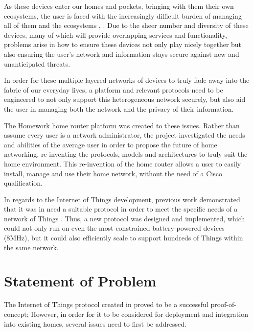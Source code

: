 \documentclass{mprop}
\begin{document}
As these devices enter our homes and pockets, bringing with them their own ecosystems, the user is faced with the increasingly difficult burden of managing all of them and the ecosystems \cite{brundell2011w}, \cite{brown2013multinet}. Due to the sheer number and diversity of these devices, many of which will provide overlapping services and functionality, problems arise in how to ensure these devices not only play nicely together but also ensuring the user's network and information stays secure against new and unanticipated threats.

In order for these multiple layered networks of devices to truly fade away into the fabric of our everyday lives, a platform and relevant protocols need to be engineered to not only support this heterogeneous network securely, but also aid the user in managing both the network and the privacy of their information.

The Homework home router platform was created to these issues. Rather than assume every user is a network administrator, the project investigated the needs and abilities of the average user in order to propose the future of home networking, re-inventing the protocols, models and architectures to truly suit the home environment. This re-invention of the home router allows a user to easily install, manage and use their home network, without the need of a Cisco qualification.

In regards to the Internet of Things development, previous work demonstrated that it was in need a suitable protocol in order to meet the specific needs of a network of Things \cite{KNoT}. Thus, a new protocol was designed and implemented, which could not only run on even the most constrained battery-powered devices (8MHz), but it could also efficiently scale to support hundreds of Things within the same network.




\section{Statement of Problem}

The Internet of Things protocol created in \cite{KNoT} proved to be a successful proof-of-concept; However, in order for it to be considered for deployment and integration into existing homes, several issues need to first be addressed.
\end{document}
